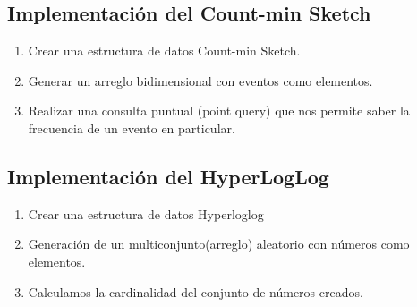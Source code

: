 \documentclass[journal]{IEEEtran}
\begin{document}
\subsection{Implementaci\'on del Count-min Sketch}

    \begin{enumerate}
	    \item
            Crear una estructura de datos Count-min Sketch.
	    \item
	    Generar un arreglo bidimensional con eventos como elementos.
	    \item
	    Realizar una consulta puntual (point query) que nos permite saber la frecuencia de un evento en particular.
	    
        \end{enumerate}

\subsection{Implementaci\'on del HyperLogLog}

     \begin{enumerate}
        \item
            Crear una estructura de datos Hyperloglog
	    \item
	    Generaci\'on de un multiconjunto(arreglo) aleatorio con n\'umeros como elementos. 
	    \item
	    Calculamos la cardinalidad del conjunto de n\'umeros creados.
        \end{enumerate}
        
\end{document}
